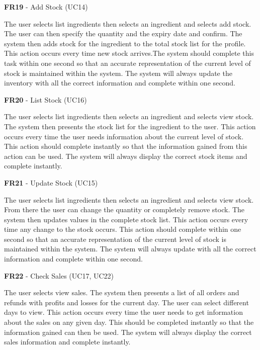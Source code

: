 \noindent \textbf{FR19} - Add Stock (UC14)\\
\begin{small}
	The user selects list ingredients then selects an ingredient and selects add stock. The user can then specify the quantity and the expiry date and confirm. The system then adds stock for the ingredient to the total stock list for the profile. This action occurs every time new stock arrives.The system should complete this task within one second so that an accurate representation of the current level of stock is maintained within the system. The system will always update the inventory with all the correct information and complete within one second.\\
\end{small}
\linebreak

\noindent \textbf{FR20} - List Stock (UC16)\\
\begin{small}
	The user selects list ingredients then selects an ingredient and selects view stock. The system then presents the stock list for the ingredient to the user. This action occurs every time the user needs information about the current level of stock. This action should complete instantly so that the information gained from this action can be used. The system will always display the correct stock items and complete instantly.\\
\end{small}
\linebreak

\noindent \textbf{FR21} - Update Stock (UC15)\\
\begin{small}
	The user selects list ingredients then selects an ingredient and selects view stock. From there the user can change the quantity or completely remove stock. The system then updates values in the complete stock list. This action occurs every time any change to the stock occurs. This action should complete within one second so that an accurate representation of the current level of stock is maintained within the system. The system will always update with all the correct information and complete within one second.\\
\end{small}
\linebreak

\noindent \textbf{FR22} - Check Sales (UC17, UC22)\\
\begin{small}
	The user selects view sales. The system then presents a list of all orders and refunds with profits and losses for the current day. The user can select different days to view. This action occurs every time the user needs to get information about the sales on any given day. This should be completed instantly so that the information gained can then be used. The system will always display the correct sales information and complete instantly.\\
\end{small}
\linebreak

